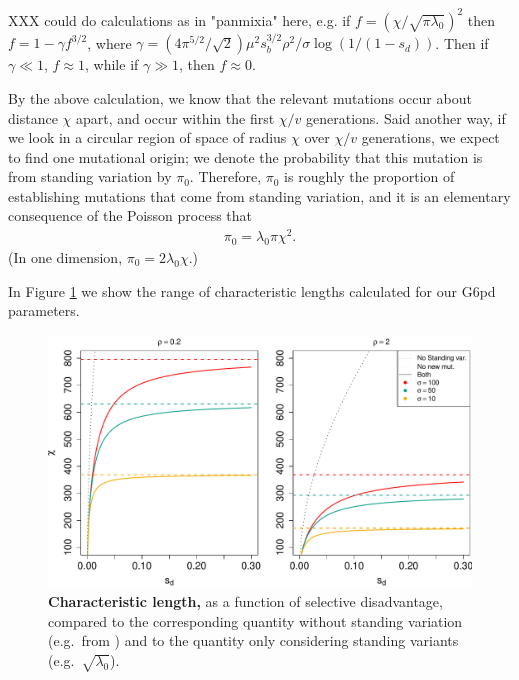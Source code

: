 \documentclass{article}
\begin{document}
XXX could do calculations as in "panmixia" here, e.g. if $f = (\chi/\sqrt{\pi \lambda_0})^2$ then
$f = 1-\gamma f^{3/2}$, where
$\gamma = (4 \pi^{5/2} / \sqrt{2}) \mu^2 s_b^{3/2} \rho^2 / \sigma \log(1/(1-s_d))$.
Then if $\gamma \ll 1$, $f \approx 1$, while if $\gamma \gg 1$, then $f \approx 0$.

By the above calculation, we know that the relevant mutations occur about distance $\chi$ apart, 
and occur within the first $\chi/v$ generations.
Said another way, if we look in a circular region of space of radius $\chi$ over $\chi/v$ generations,
we expect to find one mutational origin;
we denote the probability that this mutation is from standing variation by $\pi_0$.
Therefore, $\pi_0$ is roughly the proportion of establishing mutations that come from standing variation,
and it is an elementary consequence of the Poisson process that
\begin{align} \label{eqn:pizero}
    \pi_0 = \lambda_0 \pi \chi^2 .
\end{align}
(In one dimension, $\pi_0 = 2 \lambda_0 \chi$.)

In Figure \ref{Fig-G6PD-charlength} we show the range of characteristic lengths
calculated for our G6pd parameters. 


\begin{figure}[ht]
\begin{center}
  \includegraphics[width=1.0\textwidth]{G6PD_charlengths}   %
\caption{ %
{\bf Characteristic length,} as a function of selective disadvantage, compared to the corresponding quantity without standing variation (e.g.\ from \cite{ralphcoop2010}) and to the quantity only considering standing variants (e.g.\ $\sqrt{\lambda_0}$).
} \label{Fig-G6PD-charlength}
\end{center}
\end{figure}
\end{document}
